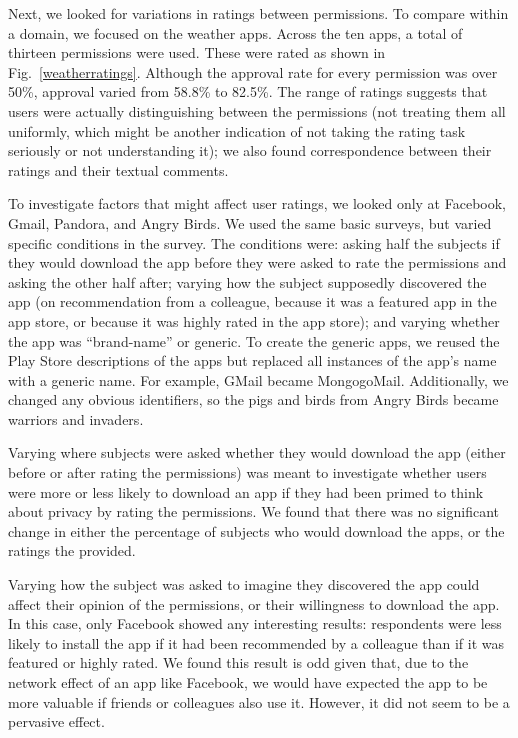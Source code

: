 \documentclass[11pt]{article}
\begin{document}
Next, we looked for variations in ratings between permissions. To
compare within a domain, we focused on the weather apps. Across the
ten apps, a total of thirteen permissions were used. These were rated
as shown in Fig.~\ref{weatherratings}.  Although the approval rate for
every permission was over 50\%, approval varied from 58.8\% to
82.5\%. The range of ratings suggests that users were actually
distinguishing between the permissions (not treating them all
uniformly, which might be another indication of not taking the rating
task seriously or not understanding it); we also found correspondence
between their ratings and their textual comments.

To investigate factors that might affect user ratings, we looked only at Facebook, Gmail,
Pandora, and Angry Birds.  We used the same basic surveys, but
varied specific conditions in the survey. The conditions 
were: asking half the subjects if they would download the app before 
they were asked to rate the permissions and asking the other half after; 
varying how the subject supposedly discovered the
app (on recommendation from a colleague, because it was a featured app in
the app store, or because it was highly rated in the app store); and
varying whether the app was ``brand-name'' or generic. To create the generic
apps, we reused the Play Store descriptions of the apps but replaced all
instances of the app's name with a generic name. For example, GMail
became MongogoMail.  Additionally, we changed any obvious identifiers,
so the pigs and birds from Angry Birds became warriors and invaders.

Varying where subjects were asked whether they would download the app 
(either before or after rating the permissions) was
meant to investigate whether users were more or less likely to
download an app if they had been primed to think about privacy by
rating the permissions. We found that there was no significant change
in either the percentage of subjects who would download the apps, or the
ratings the provided.

Varying how the subject was asked to imagine they discovered the app
could affect their opinion of the permissions, or their willingness to
download the app. In this case, only Facebook showed any interesting
results: respondents were less likely to install the app if it
had been recommended by a colleague than if it was featured or highly
rated. We found this result is odd given that, due to the network
effect of an app like Facebook, we would have expected the app to be more
valuable if friends or colleagues also use it. However, it did not
seem to be a pervasive effect.
\end{document}
